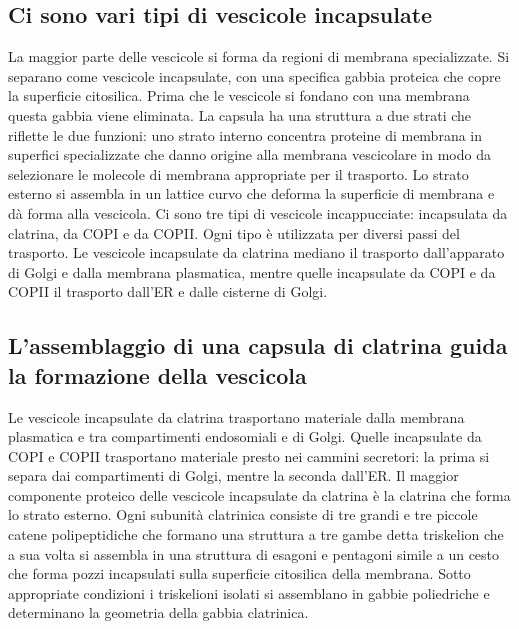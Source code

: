 \subsection{Ci sono vari tipi di vescicole incapsulate}
La maggior parte delle vescicole si forma da regioni di membrana specializzate. Si separano come vescicole incapsulate, con una specifica gabbia proteica che copre la superficie 
citosilica. Prima che le vescicole si fondano con una membrana questa gabbia viene eliminata. La capsula ha una struttura a due strati che riflette le due funzioni: uno strato interno
concentra proteine di membrana in superfici specializzate che danno origine alla membrana vescicolare in modo da selezionare le molecole di membrana appropriate per il trasporto. Lo
strato esterno si assembla in un lattice curvo che deforma la superficie di membrana e d\`a forma alla vescicola. Ci sono tre tipi di vescicole incappucciate: incapsulata da clatrina, da
COPI e da COPII. Ogni tipo \`e utilizzata per diversi passi del trasporto. Le vescicole incapsulate da clatrina mediano il trasporto dall'apparato di Golgi e dalla membrana plasmatica,
mentre quelle incapsulate da COPI e da COPII il trasporto dall'ER e dalle cisterne di Golgi. 
\subsection{L'assemblaggio di una capsula di clatrina guida la formazione della vescicola}
Le vescicole incapsulate da clatrina trasportano materiale dalla membrana plasmatica e tra compartimenti endosomiali e di Golgi. Quelle incapsulate da COPI e COPII trasportano materiale
presto nei cammini secretori: la prima si separa dai compartimenti di Golgi, mentre la seconda dall'ER. Il maggior componente proteico delle vescicole incapsulate da clatrina \`e la 
clatrina che forma lo strato esterno. Ogni subunit\`a clatrinica consiste di tre grandi e tre piccole catene polipeptidiche che formano una struttura a tre gambe detta triskelion che
a sua volta si assembla in una struttura di esagoni e pentagoni simile a un cesto che forma pozzi incapsulati sulla superficie citosilica della membrana. Sotto appropriate condizioni
i triskelioni isolati si assemblano in gabbie poliedriche e determinano la geometria della gabbia clatrinica.

